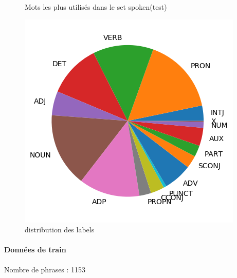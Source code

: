 \begin{figure}[H]
\begin{minipage}{0.48\textwidth}
\begin{tabular}{|l || *{11 }{|c} |}
\end{tabular}
\caption{ Mots les plus utilisés dans le set spoken(test) } \label{Fig:muw}\end{minipage} 
\begin{minipage}{0.48\textwidth} \centering
\includegraphics[width=.7\linewidth]{spokentest_img.png}
\caption{distribution des labels}
\end{minipage}
\end{figure} \paragraph{Données de train \\ }  
 Nombre de phrases : 1153\\ 
